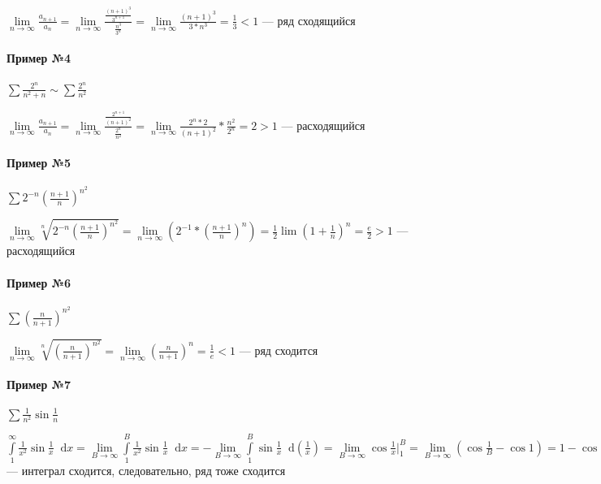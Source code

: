 \documentclass{article}
\newcommand*\diff{\mathop{}\!\mathrm{d}}
\begin{document}
$\lim\limits_{n \to \infty} \frac{a_{n + 1}}{a_{n}} = \lim\limits_{n \to \infty} \frac{\frac{(n + 1)^3}{3^{n + 1}}}{\frac{n^3}{3^n}} = \lim\limits_{n \to \infty} \frac{(n + 1)^3}{3 * n^3} = \frac{1}{3} < 1$ — ряд сходящийся

\paragraph{Пример №4}

$\sum \frac{2^{n}}{n^2 + n} \sim \sum \frac{2^{n}}{n^2}$

$\lim\limits_{n \to \infty} \frac{a_{n + 1}}{a_{n}} = \lim\limits_{n \to \infty} \frac{\frac{2^{n + 1}}{(n + 1)^2}}{\frac{2^{n}}{n^2}} = \lim\limits_{n \to \infty} \frac{2^n *2}{(n + 1)^2} * \frac{n^2}{2^{n}} = 2 > 1$ — расходящийся

\paragraph{Пример №5}

$\sum 2^{- n} (\frac{n + 1}{n})^{n^2}$

$\lim\limits_{n \to \infty} \sqrt[n]{2^{- n} (\frac{n + 1}{n})^{n^2}} = \lim\limits_{n \to \infty} (2^{-1} * (\frac{n + 1}{n})^{n}) = \frac{1}{2} \lim (1 + \frac{1}{n})^{n} = \frac{e}{2} > 1$ — расходящийся

\paragraph{Пример №6}

$\sum (\frac{n}{n + 1})^{n^2}$

$\lim\limits_{n \to \infty} \sqrt[n]{(\frac{n}{n + 1})^{n^2}} = \lim\limits_{n \to \infty} (\frac{n}{n + 1})^{n} = \frac{1}{e} < 1$ — ряд сходится

\paragraph{Пример №7}

$\sum \frac{1}{n^2} \sin \frac{1}{n}$

$\int\limits_{1}^{\infty} \frac{1}{x^2} \sin \frac{1}{x} \diff x = \lim\limits_{B \to \infty} \int\limits_{1}^{B} \frac{1}{x^2} \sin \frac{1}{x} \diff x = - \lim\limits_{B \to \infty} \int\limits_{1}^{B} \sin \frac{1}{x} \diff (\frac{1}{x}) = \lim\limits_{B \to \infty} \cos \frac{1}{x} \bigg|_{1}^{B} = \lim\limits_{B \to \infty} (\cos \frac{1}{B} - \cos 1) = 1 - \cos 1$ — интеграл сходится, следовательно, ряд тоже сходится
\end{document}
